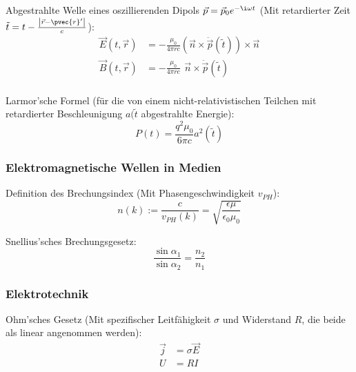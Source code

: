 \documentclass[11pt]{article}
\numberwithin{equation}{section}
\begin{document}
        Abgestrahlte Welle eines oszillierenden Dipols $\vec{p} = \vec{p}_0 e^{-\i\omega t}$ (Mit retardierter Zeit $\tilde{t} = t-\frac{\left|\vec{r}-\pvec{r}'\right|}{c}$):
        \begin{equation}
          \begin{aligned}
            \vec{E}(t,\vec{r}) &= -\frac{\mu_0}{4\pi r c}  \left(\vec{n}\times\ddot{\vec{p}}(\tilde{t})\right) \times \vec{n} \\
            \vec{B}(t,\vec{r}) &= -\frac{\mu_0}{4\pi r c} \phantom{\Big(}\vec{n}\times\ddot{\vec{p}}(\tilde{t}) \\
          \end{aligned}
        \end{equation}

        Larmor'sche Formel (für die von einem nicht-relativistischen Teilchen mit retardierter Beschleunigung $a(\tilde{t}$ abgestrahlte Energie):
        \begin{equation}
          P(t) = \frac{q^2 \mu_0}{6\pi c}a^2(\tilde{t})
        \end{equation}

      \subsubsection{Elektromagnetische Wellen in Medien}
        Definition des Brechungsindex (Mit Phasengeschwindigkeit $v_{PH}$):
        \begin{equation}
          n(k) := \frac{c}{v_{PH}(k)} = \sqrt{\frac{\epsilon\mu}{\epsilon_0\mu_0}}
        \end{equation}

        Snellius'sches Brechungsgesetz:
        \begin{equation}
          \frac{\sin\alpha_1}{\sin\alpha_2} = \frac{n_2}{n_1}
        \end{equation}



      \subsubsection{Elektrotechnik}
        Ohm'sches Gesetz (Mit spezifischer Leitfähigkeit $\sigma$ und Widerstand $R$, die beide als linear angenommen werden):
        \begin{equation}
          \begin{aligned}
            \vec{j} &= \sigma\vec{E} \\
            U &= R I
          \end{aligned}
        \end{equation}
\end{document}
